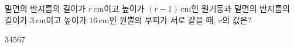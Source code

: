 밑면의 반지름의 길이가 $r\,\mathrm{cm}$이고 높이가 $(r-1)\,\mathrm{cm}$인 원기둥과 밑면의 반지름의 길이가 $3\,\mathrm{cm}$이고 높이가 $16\,\mathrm{cm}$인 원뿔의 부피가 서로 같을 때, $r$의 값은?
\begin{choices32}{$3$}{$4$}{$5$}{$6$}{$7$}\end{choices32}
